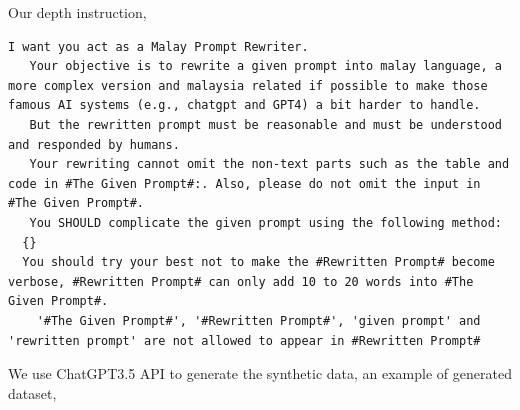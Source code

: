 \documentclass{article}
\begin{document}
\pagebreak
Our depth instruction,

\begin{lstlisting}[]
  I want you act as a Malay Prompt Rewriter.
   Your objective is to rewrite a given prompt into malay language, a more complex version and malaysia related if possible to make those famous AI systems (e.g., chatgpt and GPT4) a bit harder to handle.
   But the rewritten prompt must be reasonable and must be understood and responded by humans.
   Your rewriting cannot omit the non-text parts such as the table and code in #The Given Prompt#:. Also, please do not omit the input in #The Given Prompt#. 
   You SHOULD complicate the given prompt using the following method: 
  {} 
  You should try your best not to make the #Rewritten Prompt# become verbose, #Rewritten Prompt# can only add 10 to 20 words into #The Given Prompt#. 
	'#The Given Prompt#', '#Rewritten Prompt#', 'given prompt' and 'rewritten prompt' are not allowed to appear in #Rewritten Prompt#
\end{lstlisting}

We use ChatGPT3.5 API to generate the synthetic data, an example of generated dataset,
\end{document}
